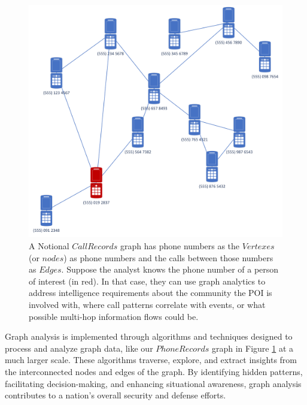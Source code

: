 \documentclass[letterpaper, 10pt]{article}
\begin{document}
\begin{multicols}{2}
        \begin{figure}
            \centering
            \includegraphics[width=\columnwidth]{Papers/ARLIS_MPR_MN/Figures/PhoneRecords.png}
            \caption{A Notional $CallRecords$ graph has phone numbers as the $Vertexes$ (or $nodes$) as phone numbers and the calls between those numbers as $Edges$. Suppose the analyst knows the phone number of a person of interest (in red). In that case, they can use graph analytics to address intelligence requirements about the community the POI is involved with, where call patterns correlate with events, or what possible multi-hop information flows could be.}
            \label{fig:callRecords}
        \end{figure}
        
        \par{Graph analysis is implemented through algorithms and techniques designed to process and analyze graph data, like our $PhoneRecords$ graph in Figure \ref{fig:callRecords} at a much larger scale. 
        These algorithms traverse, explore, and extract insights from the interconnected nodes and edges of the graph. By identifying hidden patterns, facilitating decision-making, and enhancing situational awareness, graph analysis contributes to a nation's overall security and defense efforts.} 
        

\end{multicols}
\end{document}

